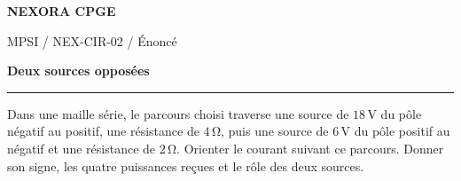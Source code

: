 \documentclass[11pt,a4paper]{article}
\begin{document}
{\small\bfseries\color{nexorablue} NEXORA CPGE}\par
{\small MPSI / NEX-CIR-02 / Énoncé}\par
{\LARGE\bfseries Deux sources opposées}\par
\vspace{0.25em}\hrule\vspace{0.6em}

Dans une maille série, le parcours choisi traverse une source de $18\,\mathrm V$ du pôle négatif au positif, une résistance de $4\,\mathrm\Omega$, puis une source de $6\,\mathrm V$ du pôle positif au négatif et une résistance de $2\,\mathrm\Omega$. Orienter le courant suivant ce parcours. Donner son signe, les quatre puissances reçues et le rôle des deux sources.
\end{document}
